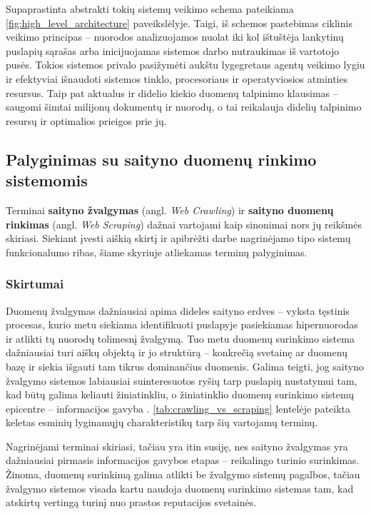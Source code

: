 
Supaprastinta abstrakti tokių sistemų veikimo schema pateikiama \ref{fig:high_level_architecture} paveikslėlyje. Taigi, iš schemos pastebimas ciklinis veikimo principas -- nuorodos analizuojamos nuolat iki kol ištuštėja lankytinų puslapių sąrašas arba inicijuojamas sistemos darbo nutraukimas iš vartotojo pusės. Tokios sistemos privalo pasižymėti aukštu lygegretaus agentų veikimo lygiu ir efektyviai išnaudoti sistemos tinklo, procesoriaus ir operatyviosios atminties resursus. Taip pat aktualus ir didelio kiekio duomenų talpinimo klausimas -- saugomi šimtai milijonų dokumentų ir nuorodų, o tai reikalauja didelių talpinimo resursų ir optimalios prieigos prie jų.

\subsection{Palyginimas su saityno duomenų rinkimo sistemomis}
Terminai \textbf{saityno žvalgymas} (angl. \textit{Web Crawling}) ir \textbf{saityno duomenų rinkimas} (angl. \textit{Web Scraping}) dažnai vartojami kaip sinonimai nors jų reikšmės skiriasi. Siekiant įvesti aiškią skirtį ir apibrėžti darbe nagrinėjamo tipo sistemų funkcionalumo ribas, šiame skyriuje atliekamas terminų palyginimas. 

\subsubsection{Skirtumai}

Duomenų žvalgymas dažniausiai apima dideles saityno erdves -- vyksta tęstinis procesas, kurio metu siekiama identifikuoti puslapyje pasiekiamas hipernuorodas ir atlikti tų nuorodų tolimesnį žvalgymą. Tuo metu duomenų surinkimo sistema dažniausiai turi aiškų objektą ir jo struktūrą -- konkrečią svetainę ar duomenų bazę ir siekia išgauti tam tikrus dominančius duomenis. Galima teigti, jog saityno žvalgymo sistemos labiausiai suinteresuotos ryšių tarp puslapių nustatymui tam, kad būtų galima keliauti žiniatinkliu, o žiniatinklio duomenų surinkimo sistemų epicentre -- informacijos gavyba \cite{OxylabsScrapingVsCrawling}. \ref{tab:crawling_vs_scraping} lentelėje pateikta keletas esminių lyginamųjų charakteristikų tarp šių vartojamų terminų.


Nagrinėjami terminai skiriasi, tačiau yra itin susiję, nes saityno žvalgymas yra dažniausiai pirmasis informacijos gavybos etapas -- reikalingo turinio surinkimas. Žinoma, duomenų surinkimą galima atlikti be žvalgymo sistemų pagalbos, tačiau žvalgymo sistemos visada kartu naudoja duomenų surinkimo sistemas tam, kad atskirtų vertingą turinį nuo prastos reputacijos svetainės. \cite{OxylabsScrapingVsCrawling}

